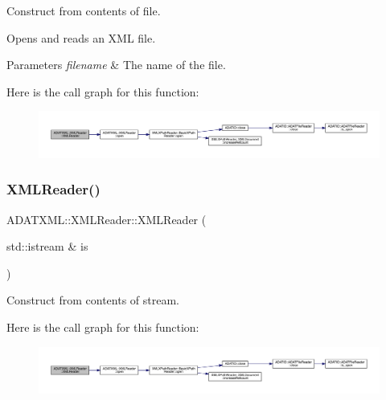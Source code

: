 Construct from contents of file. 

Opens and reads an X\+ML file. 
\begin{DoxyParams}{Parameters}
{\em filename} & The name of the file. \\
\hline
\end{DoxyParams}
Here is the call graph for this function\+:
\nopagebreak
\begin{figure}[H]
\begin{center}
\leavevmode
\includegraphics[width=350pt]{db/d3f/classADATXML_1_1XMLReader_a85d8af8a27febdd66251e20bd96ccc32_cgraph}
\end{center}
\end{figure}
\mbox{\label{classADATXML_1_1XMLReader_a8025cb1c53d6ceb8a694bdbd8e1f383b}} 
\subsubsection{\texorpdfstring{XMLReader()}{XMLReader()}\hspace{0.1cm}{\footnotesize\ttfamily [3/15]}}
{\footnotesize\ttfamily A\+D\+A\+T\+X\+M\+L\+::\+X\+M\+L\+Reader\+::\+X\+M\+L\+Reader (\begin{DoxyParamCaption}\item[{std\+::istream \&}]{is }\end{DoxyParamCaption})\hspace{0.3cm}{\ttfamily [inline]}}



Construct from contents of stream. 

Here is the call graph for this function\+:
\nopagebreak
\begin{figure}[H]
\begin{center}
\leavevmode
\includegraphics[width=350pt]{db/d3f/classADATXML_1_1XMLReader_a8025cb1c53d6ceb8a694bdbd8e1f383b_cgraph}
\end{center}
\end{figure}
\mbox{\label{classADATXML_1_1XMLReader_a6829255c2dd448f4bf315f6fd0b380a1}} 
